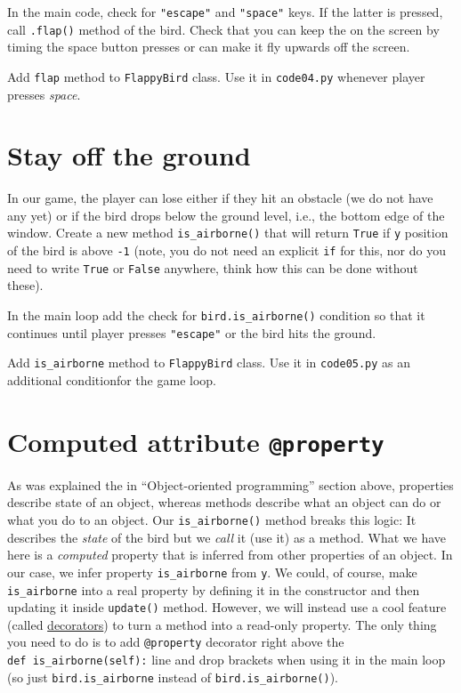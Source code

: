 \documentclass[
]{book}
\begin{document}
In the main code, check for \texttt{"escape"} and \texttt{"space"} keys. If the latter is pressed, call \texttt{.flap()} method of the bird. Check that you can keep the on the screen by timing the space button presses or can make it fly upwards off the screen.

Add \texttt{flap} method to \texttt{FlappyBird} class.
Use it in \texttt{code04.py} whenever player presses \emph{space}.

\hypertarget{stay-off-the-ground}{%
\section{Stay off the ground}\label{stay-off-the-ground}}

In our game, the player can lose either if they hit an obstacle (we do not have any yet) or if the bird drops below the ground level, i.e., the bottom edge of the window. Create a new method \texttt{is\_airborne()} that will return \texttt{True} if \texttt{y} position of the bird is above \texttt{-1} (note, you do not need an explicit \texttt{if} for this, nor do you need to write \texttt{True} or \texttt{False} anywhere, think how this can be done without these).

In the main loop add the check for \texttt{bird.is\_airborne()} condition so that it continues until player presses \texttt{"escape"} or the bird hits the ground.

Add \texttt{is\_airborne} method to \texttt{FlappyBird} class.
Use it in \texttt{code05.py} as an additional conditionfor the game loop.

\hypertarget{computed-attribute-property}{%
\section{\texorpdfstring{Computed attribute \texttt{@property}}{Computed attribute @property}}\label{computed-attribute-property}}

As was explained the in ``Object-oriented programming'' section above, properties describe state of an object, whereas methods describe what an object can do or what you do to an object. Our \texttt{is\_airborne()} method breaks this logic: It describes the \emph{state} of the bird but we \emph{call} it (use it) as a method. What we have here is a \emph{computed} property that is inferred from other properties of an object. In our case, we infer property \texttt{is\_airborne} from \texttt{y}. We could, of course, make \texttt{is\_airborne} into a real property by defining it in the constructor and then updating it inside \texttt{update()} method. However, we will instead use a cool feature (called \href{https://www.python.org/dev/peps/pep-0318/}{decorators}) to turn a method into a read-only property. The only thing you need to do is to add \texttt{@property} decorator right above the \texttt{def\ is\_airborne(self):} line and drop brackets when using it in the main loop (so just \texttt{bird.is\_airborne} instead of \texttt{bird.is\_airborne()}).
\end{document}
